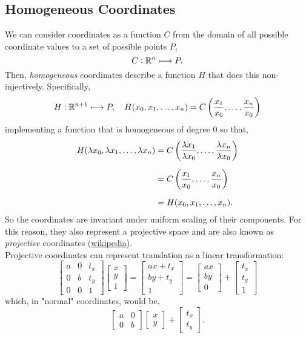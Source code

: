 \documentclass[../MathsNotesBase.tex]{subfiles}
\begin{document}
{		\subsection{Homogeneous Coordinates}
		\bigskip
		We can consider coordinates as a function $C$ from the domain of all possible coordinate values to a set of possible points $P$,
		\[ C: \mathbb{R}^{n} \longmapsto P. \]
		Then, \textit{homogeneous} coordinates describe a function $H$ that does this non-injectively. Specifically,
		\[ H: \mathbb{R}^{n+1} \longmapsto P, \hspace{10pt} H(x_0,x_1,\dots,x_n) = C\left(\frac{x_1}{x_0},\dots,\frac{x_n}{x_0}\right) \]
		implementing a function that is homogeneous of degree 0 so that,
		\[\begin{aligned}
			H(\lambda x_0,\lambda x_1,\dots,\lambda x_n) &= C\left(\frac{\lambda x_1}{\lambda x_0},\dots,\frac{\lambda x_n}{\lambda x_0}\right) \nn
			&= C\left(\frac{x_1}{x_0},\dots,\frac{x_n}{x_0}\right) \nn
			&= H(x_0,x_1,\dots,x_n).
		\end{aligned}\]
		So the coordinates are invariant under uniform scaling of their components. For this reason, they also represent a projective space and are also known as \textit{projective} coordinates (\href{https://en.wikipedia.org/wiki/Homogeneous_coordinates}{wikipedia}).\\
		
		Projective coordinates can represent translation as a linear transformation:
		\[ 	\begin{bmatrix}
				a & 0 & t_x\\
				0 & b & t_y\\
				0 & 0 & 1
			\end{bmatrix}\begin{bmatrix}x\\ y\\ 1\end{bmatrix} =
			\begin{bmatrix}ax + t_x\\ by + t_y\\ 1\end{bmatrix} =
			\begin{bmatrix}ax\\ by\\ 0\end{bmatrix} +
			\begin{bmatrix}t_x\\ t_y\\ 1\end{bmatrix}
		\]
		which, in "normal" coordinates, would be,
		\[ 	\begin{bmatrix}
				a & 0\\
				0 & b
			\end{bmatrix}\begin{bmatrix}x\\ y\end{bmatrix} + 
			\begin{bmatrix}t_x\\ t_y\end{bmatrix}.
		\]
	
}
\end{document}

